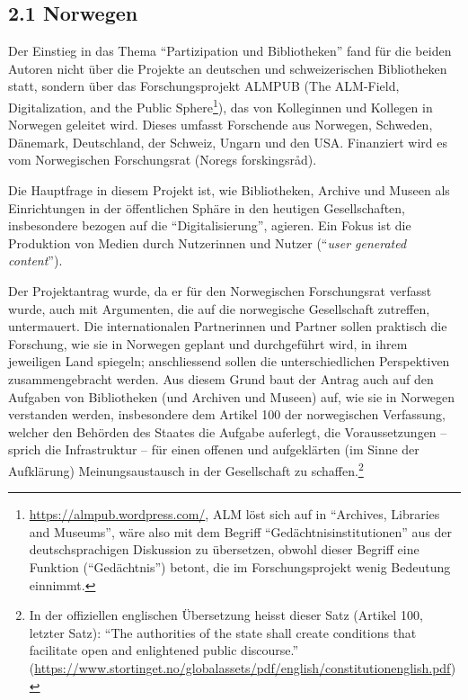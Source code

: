 \documentclass[a4paper,
fontsize=11pt,
oneside,
numbers=noperiodatend,
parskip=half-,
bibliography=totoc,
final
]{scrartcl}
\begin{document}
\hypertarget{norwegen}{%
\subsection{2.1 Norwegen}\label{norwegen}}

Der Einstieg in das Thema \enquote{Partizipation und Bibliotheken} fand
für die beiden Autoren nicht über die Projekte an deutschen und
schweizerischen Bibliotheken statt, sondern über das Forschungsprojekt
ALMPUB (The ALM-Field, Digitalization, and the Public Sphere\footnote{\url{https://almpub.wordpress.com/},
  ALM löst sich auf in \enquote{Archives, Libraries and Museums}, wäre
  also mit dem Begriff \enquote{Gedächtnisinstitutionen} aus der
  deutschsprachigen Diskussion zu übersetzen, obwohl dieser Begriff eine
  Funktion (\enquote{Gedächtnis}) betont, die im Forschungsprojekt wenig
  Bedeutung einnimmt.}), das von Kolleginnen und Kollegen in Norwegen
geleitet wird. Dieses umfasst Forschende aus Norwegen, Schweden,
Dänemark, Deutschland, der Schweiz, Ungarn und den USA. Finanziert wird
es vom Norwegischen Forschungsrat (Noregs forskingsråd).

Die Hauptfrage in diesem Projekt ist, wie Bibliotheken, Archive und
Museen als Einrichtungen in der öffentlichen Sphäre in den heutigen
Gesellschaften, insbesondere bezogen auf die \enquote{Digitalisierung},
agieren. Ein Fokus ist die Produktion von Medien durch Nutzerinnen und
Nutzer (\enquote{\emph{user generated content}}).

Der Projektantrag wurde, da er für den Norwegischen Forschungsrat
verfasst wurde, auch mit Argumenten, die auf die norwegische
Gesellschaft zutreffen, untermauert. Die internationalen Partnerinnen
und Partner sollen praktisch die Forschung, wie sie in Norwegen geplant
und durchgeführt wird, in ihrem jeweiligen Land spiegeln; anschliessend
sollen die unterschiedlichen Perspektiven zusammengebracht werden. Aus
diesem Grund baut der Antrag auch auf den Aufgaben von Bibliotheken (und
Archiven und Museen) auf, wie sie in Norwegen verstanden werden,
insbesondere dem Artikel 100 der norwegischen Verfassung, welcher den
Behörden des Staates die Aufgabe auferlegt, die Voraussetzungen --
sprich die Infrastruktur -- für einen offenen und aufgeklärten (im Sinne
der Aufklärung) Meinungsaustausch in der Gesellschaft zu
schaffen.\footnote{In der offiziellen englischen Übersetzung heisst
  dieser Satz (Artikel 100, letzter Satz): \enquote{The authorities of
  the state shall create conditions that facilitate open and enlightened
  public discourse.}
  (\url{https://www.stortinget.no/globalassets/pdf/english/constitutionenglish.pdf})}
\end{document}
